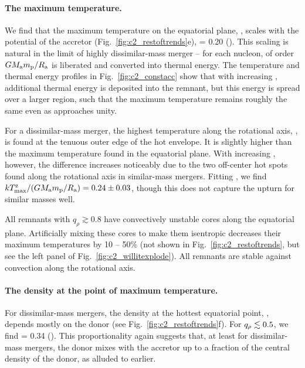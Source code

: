 \paragraph{The maximum temperature.} We find that the maximum temperature on the equatorial plane, \Tmax, scales with the potential of the accretor (Fig.~\ref{fig:c2_restoftrends}e),
\eqbegin
{} = 0.20
\qquad().
\eqend
This scaling is natural in the limit of highly dissimilar-mass merger -- for each nucleon, of order $G\Ma m_\mathrm{p}/\Ra$ is liberated and converted into thermal energy.  The temperature and thermal energy profiles in Fig.~\ref{fig:c2_constacc} show that with increasing {\qrho}, additional thermal energy is deposited into the remnant, but this energy is spread over a larger region, such that the maximum temperature remains roughly the same even as {\qrho} approaches unity.  

For a dissimilar-mass merger, the highest temperature along the rotational axis, \zTmax, is found at the tenuous outer edge of the hot envelope.  It is slightly higher than the maximum temperature found in the equatorial plane.  With increasing \qrho, however, the difference increases noticeably due to the two off-center hot spots found along the rotational axis in similar-mass mergers.  Fitting \zTmax, we find $k\zTmax/(G\Ma m_{\rm p}/\Ra) = 0.24\pm0.03$, though this does not capture the upturn for similar masses well.

All remnants with $q_\rho\gtrsim0.8$ have convectively unstable cores along the equatorial plane.  Artificially mixing these cores to make them isentropic decreases their maximum temperatures by 10 -- 50\% (not shown in Fig.~\ref{fig:c2_restoftrends}, but see the left panel of Fig.~\ref{fig:c2_willitexplode}).  All remnants are stable against convection along the rotational axis.

\paragraph{The density at the point of maximum temperature.}  For dissimilar-mass mergers, the density at the hottest equatorial point, \rhoTmax, depends mostly on the donor (see Fig.~\ref{fig:c2_restoftrends}f).  For $\qrho\lesssim0.5$, we find
\eqbegin
{} = 0.34
\qquad().
\eqend
This proportionality again suggests that, at least for dissimilar-mass mergers, the donor mixes with the accretor up to a fraction of the central density of the donor, as alluded to earlier.  

